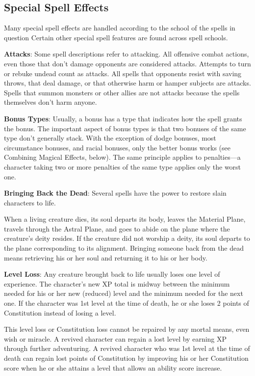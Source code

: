 \subsection{Special Spell Effects}
Many special spell effects are handled according to the school of the spells in question Certain other special spell features are found across spell schools.

\textbf{Attacks}: Some spell descriptions refer to attacking. All offensive combat actions, even those that don't damage opponents are considered attacks. Attempts to turn or rebuke undead count as attacks. All spells that opponents resist with saving throws, that deal damage, or that otherwise harm or hamper subjects are attacks. Spells that summon monsters or other allies are not attacks because the spells themselves don't harm anyone.

\textbf{Bonus Types}: Usually, a bonus has a type that indicates how the spell grants the bonus. The important aspect of bonus types is that two bonuses of the same type don't generally stack. With the exception of dodge bonuses, most circumstance bonuses, and racial bonuses, only the better bonus works (see Combining Magical Effects, below). The same principle applies to penalties---a character taking two or more penalties of the same type applies only the worst one.

\textbf{Bringing Back the Dead}: Several spells have the power to restore slain characters to life.

When a living creature dies, its soul departs its body, leaves the Material Plane, travels through the Astral Plane, and goes to abide on the plane where the creature's deity resides. If the creature did not worship a deity, its soul departs to the plane corresponding to its alignment. Bringing someone back from the dead means retrieving his or her soul and returning it to his or her body.

\textbf{Level Loss}: Any creature brought back to life usually loses one level of experience. The character's new XP total is midway between the minimum needed for his or her new (reduced) level and the minimum needed for the next one. If the character was 1st level at the time of death, he or she loses 2 points of Constitution instead of losing a level.

This level loss or Constitution loss cannot be repaired by any mortal means, even wish or miracle. A revived character can regain a lost level by earning XP through further adventuring. A revived character who was 1st level at the time of death can regain lost points of Constitution by improving his or her Constitution score when he or she attains a level that allows an ability score increase.

